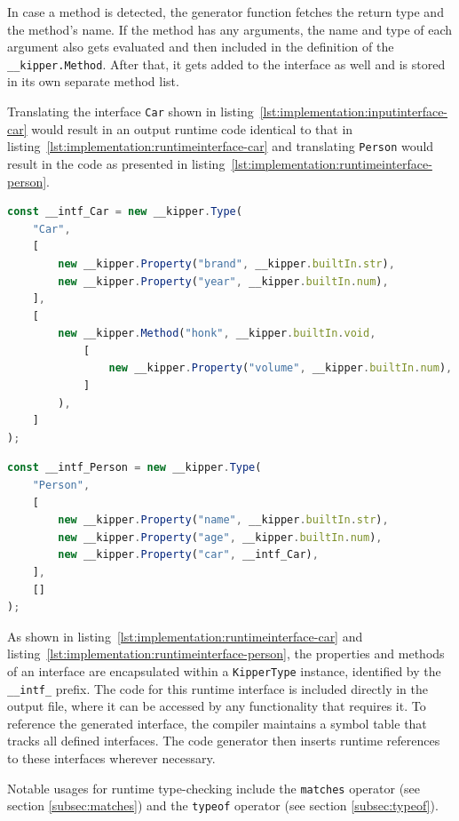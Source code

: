 In case a method is detected, the generator function fetches the return type and the method's name. If the method has any arguments, the name and type of each argument also gets evaluated and then included in the definition of the \lstinline|__kipper.Method|. After that, it gets added to the interface as well and is stored in its own separate method list.

Translating the interface \lstinline|Car| shown in listing~\ref{lst:implementation:inputinterface-car} would result in an output runtime code identical to that in listing~\ref{lst:implementation:runtimeinterface-car} and translating \lstinline|Person| would result in the code as presented in listing~\ref{lst:implementation:runtimeinterface-person}.

\begin{lstlisting}[language=Typescript,caption=The runtime representation of the example interface \lstinline|Car|,label=lst:implementation:runtimeinterface-car]
const __intf_Car = new __kipper.Type(
	"Car",
	[
		new __kipper.Property("brand", __kipper.builtIn.str),
		new __kipper.Property("year", __kipper.builtIn.num),
	],
	[
		new __kipper.Method("honk", __kipper.builtIn.void,
			[
				new __kipper.Property("volume", __kipper.builtIn.num),
			]
		),
	]
);
\end{lstlisting}

\begin{lstlisting}[language=Typescript,caption=The runtime representation of the example interface \lstinline|Person|,label=lst:implementation:runtimeinterface-person]
const __intf_Person = new __kipper.Type(
	"Person",
	[
		new __kipper.Property("name", __kipper.builtIn.str),
		new __kipper.Property("age", __kipper.builtIn.num),
		new __kipper.Property("car", __intf_Car),
	],
	[]
);
\end{lstlisting}

As shown in listing~\ref{lst:implementation:runtimeinterface-car} and listing~\ref{lst:implementation:runtimeinterface-person}, the properties and methods of an interface are encapsulated within a \lstinline|KipperType| instance, identified by the  \lstinline|__intf_| prefix. The code for this runtime interface is included directly in the output file, where it can be accessed by any functionality that requires it. To reference the generated interface, the compiler maintains a symbol table that tracks all defined interfaces. The code generator then inserts runtime references to these interfaces wherever necessary.

Notable usages for runtime type-checking include the \lstinline|matches| operator (see section \ref{subsec:matches}) and the \lstinline|typeof| operator (see section \ref{subsec:typeof}).

